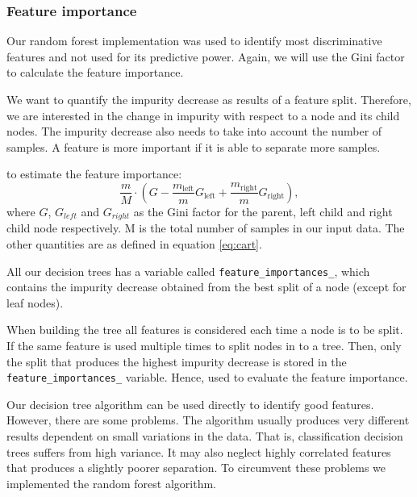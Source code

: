 \subsubsection{Feature importance} \label{sec:feature_imporance} 
Our random forest implementation was used to identify most discriminative
features and not used for its predictive power. Again, we will use the Gini
factor to calculate the feature importance. 


We want to quantify the impurity decrease as results of a feature split.
Therefore, we are interested in the change in impurity with respect to a node and its
child nodes. The impurity decrease also needs to take into account the number
of samples. A feature is more important if it is able to separate more samples.       

to estimate the feature importance: 
\begin{equation*}
    \frac{m}{M} \cdot (G  - \frac{m_{\text{left}} }{m} G_{\text{left}}+
    \frac{m_{\text{right}} }{m} G_{\text{right}}), 
\end{equation*}
where $G$, $G_{left} $ and $G_{right} $ as the Gini factor for the parent,
left child and right child node respectively. M is the total number of samples
in our input data. The other quantities are as defined in equation
\ref{eq:cart}. 

All our decision trees has a variable called \verb|feature_importances_|, which
contains the impurity decrease obtained from the best split of a node (except
for leaf nodes).   

When building the tree all features is considered each time a node is to be
split. If the same feature is used multiple times to split nodes in to a tree.
Then, only the split that produces the highest impurity decrease is stored in
the \verb|feature_importances_| variable. Hence, used to evaluate the feature
importance.      



Our decision tree algorithm can be used directly to identify good features.
However, there are some problems. The algorithm usually produces very different
results dependent on small variations in the data. That is, classification
decision trees suffers from high variance. It may also neglect highly
correlated features that produces a slightly poorer separation. To circumvent
these problems we implemented the random forest algorithm. 


